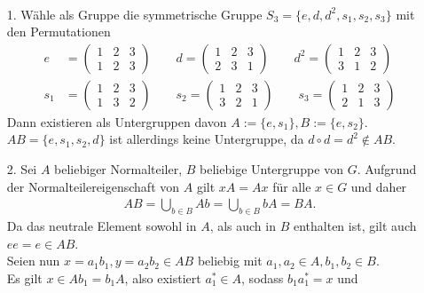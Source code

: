 \begin{solution}
\leavevmode \\
\begin{itemize}
  \item [1.] Wähle als Gruppe die symmetrische Gruppe $S_3 = \{e,d,d^2,s_1,s_2,s_3\}$
  mit den Permutationen
  \begin{align*}
  e &= \begin{pmatrix}
      1 & 2 & 3 \\
      1 & 2 & 3
    \end{pmatrix} \qquad
  d = \begin{pmatrix}
    1 & 2 & 3 \\
    2 & 3 & 1
  \end{pmatrix} \qquad
  d^2 = \begin{pmatrix}
    1 & 2 & 3 \\
    3 & 1 & 2
  \end{pmatrix} \\
  s_1 &= \begin{pmatrix}
    1 & 2 & 3 \\
    1 & 3 & 2
  \end{pmatrix} \qquad
  s_2 = \begin{pmatrix}
    1 & 2 & 3 \\
    3 & 2 & 1
  \end{pmatrix} \qquad
  s_3 = \begin{pmatrix}
    1 & 2 & 3 \\
    2 & 1 & 3
  \end{pmatrix}
  \end{align*}
  Dann existieren als Untergruppen davon $A := \{e,s_1\}, B := \{e,s_2\}$. \\
  $AB = \{e,s_1,s_2, d\}$ ist allerdings keine Untergruppe, da $d \circ d = d^2 \notin AB$.
  \item [2.] Sei $A$ beliebiger Normalteiler, $B$ beliebige Untergruppe von $G$.
  Aufgrund der Normalteilereigenschaft von $A$ gilt $xA = Ax$ für alle
  $x \in G$ und daher
  \begin{align*}
    AB = \bigcup_{b \in B}Ab = \bigcup_{b \in B}bA = BA.
  \end{align*}
  Da das neutrale Element sowohl in $A$, als auch in $B$ enthalten ist, gilt auch
  $ee = e \in AB$. \\
  Seien nun $x= a_1b_1, y = a_2b_2 \in AB$ beliebig mit $a_1,a_2 \in A, b_1,b_2 \in B$. \\
  Es gilt $x \in Ab_1 = b_1A$, also existiert $a_1^* \in A$, sodass $b_1a_1^* = x$ und

\end{itemize}
\end{solution}
